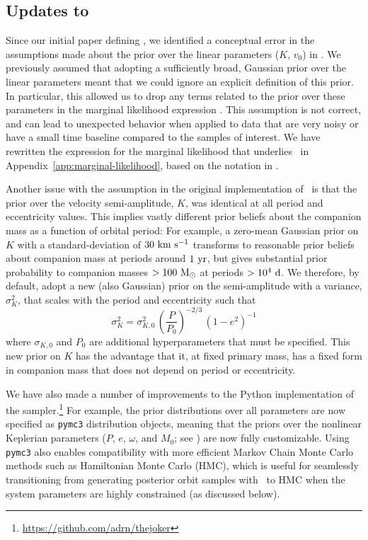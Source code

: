 \documentclass[modern]{aastex63}
\begin{document}
\subsection{Updates to \thejoker}
\label{sec:joker-update}

Since our initial paper defining \thejoker, we identified a conceptual error in
the assumptions made about the prior over the linear parameters ($K$, $v_0$) in
\citet{thejoker}.
We previously assumed that adopting a sufficiently broad, Gaussian prior over
the linear parameters meant that we could ignore an explicit definition of this
prior.
In particular, this allowed us to drop any terms related to the prior over these
parameters in the marginal likelihood expression \citep[\equationname~11
in][]{thejoker}.
This assumption is not correct, and can lead to unexpected behavior when applied
to data that are very noisy or have a small time baseline compared to the
samples of interest.
We have rewritten the expression for the marginal likelihood that underlies
\thejoker\ in Appendix~\ref{app:marginal-likelihood}, based on the notation in
\cite{Hogg:2020}.

Another issue with the assumption in the original implementation of \thejoker\
is that the prior over the velocity semi-amplitude, $K$, was identical at all
period and eccentricity values.
This implies vastly different prior beliefs about the companion mass as a
function of orbital period: For example, a zero-mean Gaussian prior on $K$ with
a standard-deviation of $30~\mathrm{km}~\mathrm{s}^{-1}$ transforms to reasonable prior beliefs about
companion mass at periods around $1~\mathrm{yr}$, but gives substantial prior
probability to companion masses $>100~\mathrm{M}_\odot$ at periods $>10^4~\mathrm{d}$.
We therefore, by default, adopt a new (also Gaussian) prior on the
semi-amplitude with a variance, $\sigma^2_K$, that scales with the
period and eccentricity such that
\begin{equation}
    \sigma^2_K = \sigma^2_{K, 0} \, \left(\frac{P}{P_0}\right)^{-2/3} \,
        \left(1 - e^2\right)^{-1} \label{eq:sigK}
\end{equation}
where $\sigma_{K, 0}$ and $P_0$ are additional hyperparameters that must be
specified.
This new prior on $K$ has the advantage that it, at fixed primary mass, has a
fixed form in companion mass that does not depend on period or eccentricity.

We have also made a number of improvements to the Python implementation of the
sampler.\footnote{\url{https://github.com/adrn/thejoker}}
For example, the prior distributions over all parameters are now specified as
\texttt{pymc3} \citep{Salvatier2016} distribution objects, meaning that the
priors over the nonlinear Keplerian parameters ($P$, $e$, $\omega$, and $M_0$;
see \citealt{thejoker}) are now fully customizable.
Using \texttt{pymc3} also enables compatibility with more efficient Markov Chain
Monte Carlo methods such as Hamiltonian Monte Carlo (HMC), which is useful for
seamlessly transitioning from generating posterior orbit samples with \thejoker\
to HMC when the system parameters are highly constrained (as discussed below).
\end{document}
